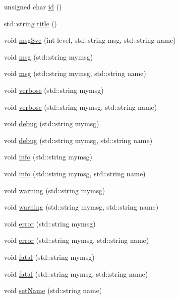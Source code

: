 \begin{DoxyCompactItemize}
\item 
unsigned char \hyperlink{classObject_af99145335cc61ff6e2798ea17db009d2}{id} ()
\item 
std::string \hyperlink{classObject_a73a0f1a41828fdd8303dd662446fb6c3}{title} ()
\item 
void \hyperlink{classObject_a3f9d5537ebce0c0f2bf6ae4d92426f3c}{msgSvc} (int level, std::string msg, std::string name)
\item 
void \hyperlink{classObject_a58b2d0618c2d08cf2383012611528d97}{msg} (std::string mymsg)
\item 
void \hyperlink{classObject_ac5d59299273cee27aacf7de00d2e7034}{msg} (std::string mymsg, std::string name)
\item 
void \hyperlink{classObject_a83d2db2df682907ea1115ad721c1c4a1}{verbose} (std::string mymsg)
\item 
void \hyperlink{classObject_a2d4120195317e2a3c6532e8bb9f3da68}{verbose} (std::string mymsg, std::string name)
\item 
void \hyperlink{classObject_aac010553f022165573714b7014a15f0d}{debug} (std::string mymsg)
\item 
void \hyperlink{classObject_a6c9a0397ca804e04d675ed05683f5420}{debug} (std::string mymsg, std::string name)
\item 
void \hyperlink{classObject_a644fd329ea4cb85f54fa6846484b84a8}{info} (std::string mymsg)
\item 
void \hyperlink{classObject_a1ca123253dfd30fc28b156f521dcbdae}{info} (std::string mymsg, std::string name)
\item 
void \hyperlink{classObject_a65cd4fda577711660821fd2cd5a3b4c9}{warning} (std::string mymsg)
\item 
void \hyperlink{classObject_a11f101db4dd73d9391b0231818881d86}{warning} (std::string mymsg, std::string name)
\item 
void \hyperlink{classObject_a204a95f57818c0f811933917a30eff45}{error} (std::string mymsg)
\item 
void \hyperlink{classObject_ad7f6c457733082efa2f9ff5f5c8e119a}{error} (std::string mymsg, std::string name)
\item 
void \hyperlink{classObject_aad5a16aac7516ce65bd5ec02ab07fc80}{fatal} (std::string mymsg)
\item 
void \hyperlink{classObject_ae62acd3d09f716220f75f252dc38bc9a}{fatal} (std::string mymsg, std::string name)
\item 
void \hyperlink{classObject_ae30fea75683c2d149b6b6d17c09ecd0c}{setName} (std::string name)

\end{DoxyCompactItemize}
